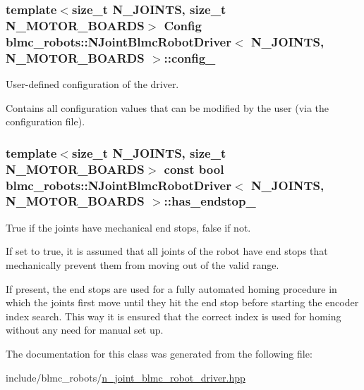 \subsubsection[{\texorpdfstring{config\+\_\+}{config_}}]{\setlength{\rightskip}{0pt plus 5cm}template$<$size\+\_\+t N\+\_\+\+J\+O\+I\+N\+TS, size\+\_\+t N\+\_\+\+M\+O\+T\+O\+R\+\_\+\+B\+O\+A\+R\+DS$>$ {\bf Config} {\bf blmc\+\_\+robots\+::\+N\+Joint\+Blmc\+Robot\+Driver}$<$ N\+\_\+\+J\+O\+I\+N\+TS, N\+\_\+\+M\+O\+T\+O\+R\+\_\+\+B\+O\+A\+R\+DS $>$\+::config\+\_\+\hspace{0.3cm}{\ttfamily [protected]}}\hypertarget{classblmc__robots_1_1NJointBlmcRobotDriver_a704ad05a652572289b74525e18680c11}{}\label{classblmc__robots_1_1NJointBlmcRobotDriver_a704ad05a652572289b74525e18680c11}


User-\/defined configuration of the driver. 

Contains all configuration values that can be modified by the user (via the configuration file). 
\subsubsection[{\texorpdfstring{has\+\_\+endstop\+\_\+}{has_endstop_}}]{\setlength{\rightskip}{0pt plus 5cm}template$<$size\+\_\+t N\+\_\+\+J\+O\+I\+N\+TS, size\+\_\+t N\+\_\+\+M\+O\+T\+O\+R\+\_\+\+B\+O\+A\+R\+DS$>$ const bool {\bf blmc\+\_\+robots\+::\+N\+Joint\+Blmc\+Robot\+Driver}$<$ N\+\_\+\+J\+O\+I\+N\+TS, N\+\_\+\+M\+O\+T\+O\+R\+\_\+\+B\+O\+A\+R\+DS $>$\+::has\+\_\+endstop\+\_\+}\hypertarget{classblmc__robots_1_1NJointBlmcRobotDriver_a4da9d51841e9b2995e597ae52c460586}{}\label{classblmc__robots_1_1NJointBlmcRobotDriver_a4da9d51841e9b2995e597ae52c460586}


True if the joints have mechanical end stops, false if not. 

If set to true, it is assumed that all joints of the robot have end stops that mechanically prevent them from moving out of the valid range.

If present, the end stops are used for a fully automated homing procedure in which the joints first move until they hit the end stop before starting the encoder index search. This way it is ensured that the correct index is used for homing without any need for manual set up. 

The documentation for this class was generated from the following file\+:\begin{DoxyCompactItemize}
\item 
include/blmc\+\_\+robots/\hyperlink{n__joint__blmc__robot__driver_8hpp}{n\+\_\+joint\+\_\+blmc\+\_\+robot\+\_\+driver.\+hpp}\end{DoxyCompactItemize}
